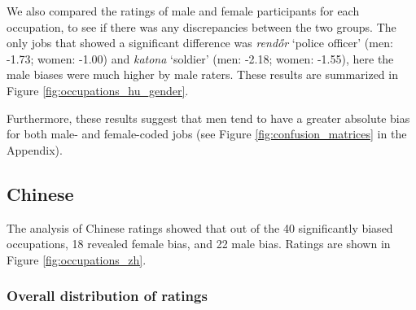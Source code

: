 \documentclass[11pt]{article}
\begin{document}
We also compared the ratings of male and female participants for each occupation, to see if there was any discrepancies between the two groups. The only jobs that showed a significant difference was \textit{rendőr} `police officer' (men: -1.73; women: -1.00) and \textit{katona} `soldier' (men: -2.18; women: -1.55), here the male biases were much higher by male raters. These results are summarized in Figure \ref{fig:occupations_hu_gender}.

Furthermore, these results suggest that men tend to have a greater absolute bias for both male- and female-coded jobs (see Figure \ref{fig:confusion_matrices} in the Appendix).



\subsection{Chinese}



The analysis of Chinese ratings showed that out of the 40 significantly biased occupations, 18 revealed female bias, and 22 male bias. Ratings are shown in Figure \ref{fig:occupations_zh}.

\subsubsection{Overall distribution of ratings}

\end{document}
